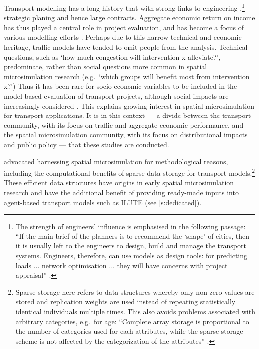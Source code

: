 Transport modelling has a long history that with strong links to engineering
,\footnote{The strength of engineers'
influence is emphasised in the following passage: ``If the main brief
of the planners is to recommend the `shape' of cities,
then it is usually left to the engineers to design, build and manage the
transport systems. Engineers,
therefore, can use models as design tools: for predicting loads ...
network optimisation ... they will have concerns with project
appraisal'' \citep[p.~16]{Wilson1998-past}.}
strategic planing \citep{Wilson1998-past} and hence large contracts.
Aggregate economic return on income has thus played a central role in
project evaluation, and has become a focus of various modelling efforts
\citep{Masser1992}.
Perhaps due to this narrow technical and economic heritage, traffic models
have tended to omit people from the analysis. Technical
questions, such as `how much congestion will intervention x alleviate?',
predominate, rather
than social questions more common in spatial microsimulation research
(e.g.~`which groups will benefit most from intervention x?')
Thus it has been rare for socio-economic variables to be included in
the model-based evaluation of transport projects, although
social impacts are increasingly considered \citep{Masser1992, Tribby2012}.
This explains growing interest
in spatial microsimulation for transport applications.
It is in this context --- a divide between the transport community, with its focus
on traffic and aggregate economic performance, and the spatial microsimulation
community, with its focus on distributional impacts and public policy --- that these
studies are conducted. 


\citet{Pritchard2012} advocated harnessing spatial microsimulation
for methodological reasons, including the computational benefits of sparse data storage
for transport models.\footnote{Sparse storage here refers to data structures
whereby only non-zero values are stored and replication
weights are used instead of repeating statistically identical individuals multiple
times. This also avoids problems associated with arbitrary categories, e.g.~for
age: ``Complete array storage is proportional to the number of categories used
for each attributes, while the sparse storage scheme is not affected by the
categorization of the attributes'' \citep[p.~691]{Pritchard2012}.} These
efficient %
data structures have origins in early spatial microsimulation
research \citep{Holm1987, Williamson1998} and have the additional benefit
of providing ready-made inputs into agent-based transport models such as
ILUTE (see \cref{s:dedicated}).



